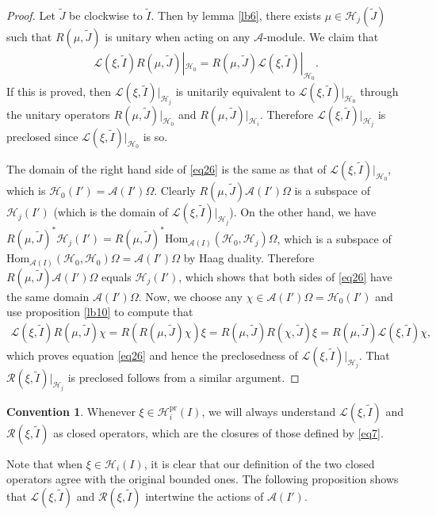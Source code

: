 \documentclass[12pt,a4paper]{article}
\theoremstyle{definition}
\newtheorem{cv}[df]{Convention}
\theoremstyle{plain}
\newcommand{\mc}{\mathcal}
\newcommand{\wtd}{\widetilde}
\newcommand{\Hom}{\mathrm{Hom}}
\newcommand{\scr}{\mathscr}
\newcommand{\pr}{\mathrm{pr}}
\numberwithin{equation}{subsection}
\begin{document}
\begin{proof}
Let $\wtd J$ be clockwise to $\wtd I$. Then by lemma \ref{lb6}, there exists $\mu\in\mc H_j(\wtd J)$ such that $R(\mu,\wtd J)$ is unitary when acting on any $\mc A$-module. We claim that
\begin{align}
\scr L(\xi,\wtd I)R(\mu,\wtd J)|_{\mc H_0}= R(\mu,\wtd J)\scr L(\xi,\wtd I)|_{\mc H_0}.\label{eq26}
\end{align}
If this is proved, then $\scr L(\xi,\wtd I)|_{\mc H_j}$ is unitarily equivalent to $\scr L(\xi,\wtd I)|_{\mc H_0}$ through the unitary operators $R(\mu,\wtd J)|_{\mc H_0}$ and $R(\mu,\wtd J)|_{\mc H_i}$. Therefore $\scr L(\xi,\wtd I)|_{\mc H_j}$ is preclosed since $\scr L(\xi,\wtd I)|_{\mc H_0}$ is so.

The domain of the right hand side of \eqref{eq26} is the same as that of $\scr L(\xi,\wtd I)|_{\mc H_0}$, which is $\mc H_0(I')=\mc A(I')\Omega$. Clearly $R(\mu,\wtd J)\mc A(I')\Omega$ is a subspace of $\mc H_j(I')$ (which is the domain of $\scr L(\xi,\wtd I)|_{\mc H_j}$). On the other hand, we have $R(\mu,\wtd J)^*\mc H_j(I')=R(\mu,\wtd J)^*\Hom_{\mc A(I)}(\mc H_0,\mc H_j)\Omega$, which is a subspace of $\Hom_{\mc A(I)}(\mc H_0,\mc H_0)\Omega=\mc A(I')\Omega$ by Haag duality. Therefore $R(\mu,\wtd J)\mc A(I')\Omega$ equals $\mc H_j(I')$, which shows that both sides of \eqref{eq26} have the same domain $\mc A(I')\Omega$. Now, we choose any $\chi\in\mc A(I')\Omega=\mc H_0(I')$ and use proposition \ref{lb10} to compute that
\begin{align*}
\scr L(\xi,\wtd I)R(\mu,\wtd J)\chi=R(R(\mu,\wtd J)\chi)\xi=R(\mu,\wtd J)R(\chi,\wtd J)\xi=R(\mu,\wtd J)\scr L(\xi,\wtd I)\chi,
\end{align*}
which proves equation \eqref{eq26} and hence the preclosedness of $\scr L(\xi,\wtd I)|_{\mc H_j}$. That $\scr R(\xi,\wtd I)|_{\mc H_j}$ is preclosed follows from a similar argument.
\end{proof}

\begin{cv}
Whenever $\xi\in\mc H_i^\pr(I)$, we will always understand $\scr L(\xi,\wtd I)$ and $\scr R(\xi,\wtd I)$ as closed operators, which are the closures of those defined by \eqref{eq7}.
\end{cv}

Note that when $\xi\in\mc H_i(I)$, it is clear  that our definition of the two closed operators agree with the original bounded ones. The following proposition shows that $\scr L(\xi,\wtd I)$ and $\scr R(\xi,\wtd I)$ intertwine the actions of $\mc A(I')$.
\end{document}
